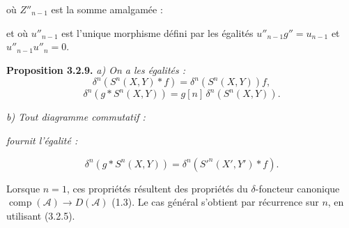 \clearpage
{}%
\begingroup\small\setlength{\parskip}{0pt}\setlength{\emergencystretch}{1.5em}
\setlength{\abovedisplayskip}{4pt plus 2pt minus 2pt}%
\setlength{\belowdisplayskip}{4pt plus 2pt minus 2pt}%

où $Z''_{n-1}$ est la somme amalgamée :

\begin{center}
\end{center}
et où $u''_{n-1}$ est l'unique morphisme défini par les égalités
$u''_{n-1}g''=u_{n-1}$ et $u''_{n-1}u''_n=0$.

\medskip\noindent\textbf{Proposition 3.2.9.}\quad
\textit{a) On a les égalités :}
\[
\delta^n(S^n(X,Y)*f)=\delta^n(S^n(X,Y))f,
\]
\[
\delta^n(g*S^n(X,Y))=g[n]\,\delta^n(S^n(X,Y)).
\]

\noindent\textit{b) Tout diagramme commutatif :}
\begin{center}
\end{center}
\noindent\textit{fournit l'égalité :}

\begin{equation}
\delta^n(g*S^n(X,Y))=\delta^n({S'}^n(X',Y')*f).
\tag{3.2.9.1}
\end{equation}

Lorsque $n=1$, ces propriétés résultent des propriétés du
$\delta$-foncteur canonique
$\operatorname{comp}(\mathcal A)\longrightarrow D(\mathcal A)$ (1.3).
Le cas général s'obtient par récurrence sur $n$, en utilisant (3.2.5).

